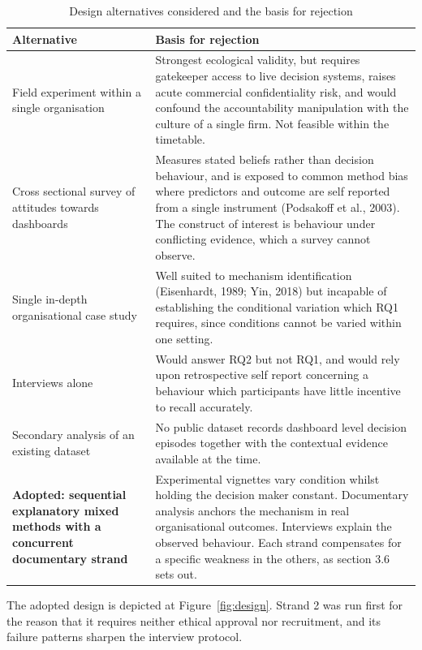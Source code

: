 \documentclass[12pt,a4paper]{article}
\begin{document}
\begin{table}[H]
\centering\footnotesize
\caption{Design alternatives considered and the basis for rejection}
\label{tab:alt}
\begin{tabularx}{\textwidth}{@{}p{3.4cm} X@{}}
\toprule
\textbf{Alternative} & \textbf{Basis for rejection} \\
\midrule
Field experiment within a single organisation & Strongest ecological validity, but requires gatekeeper
access to live decision systems, raises acute commercial confidentiality risk, and would confound the
accountability manipulation with the culture of a single firm. Not feasible within the timetable. \\
Cross sectional survey of attitudes towards dashboards & Measures stated beliefs rather than decision
behaviour, and is exposed to common method bias where predictors and outcome are self reported from a single
instrument (Podsakoff et al., 2003). The construct of interest is behaviour under conflicting evidence,
which a survey cannot observe. \\
Single in-depth organisational case study & Well suited to mechanism identification (Eisenhardt, 1989; Yin,
2018) but incapable of establishing the conditional variation which RQ1 requires, since conditions cannot be
varied within one setting. \\
Interviews alone & Would answer RQ2 but not RQ1, and would rely upon retrospective self report concerning a
behaviour which participants have little incentive to recall accurately. \\
Secondary analysis of an existing dataset & No public dataset records dashboard level decision episodes
together with the contextual evidence available at the time. \\
\midrule
\textbf{Adopted: sequential explanatory mixed methods with a concurrent documentary strand} & Experimental
vignettes vary condition whilst holding the decision maker constant. Documentary analysis anchors the
mechanism in real organisational outcomes. Interviews explain the observed behaviour. Each strand
compensates for a specific weakness in the others, as section 3.6 sets out. \\
\bottomrule
\end{tabularx}
\end{table}

The adopted design is depicted at Figure~\ref{fig:design}. Strand 2 was run first for the reason that it
requires neither ethical approval nor recruitment, and its failure patterns sharpen the interview protocol.
\end{document}
